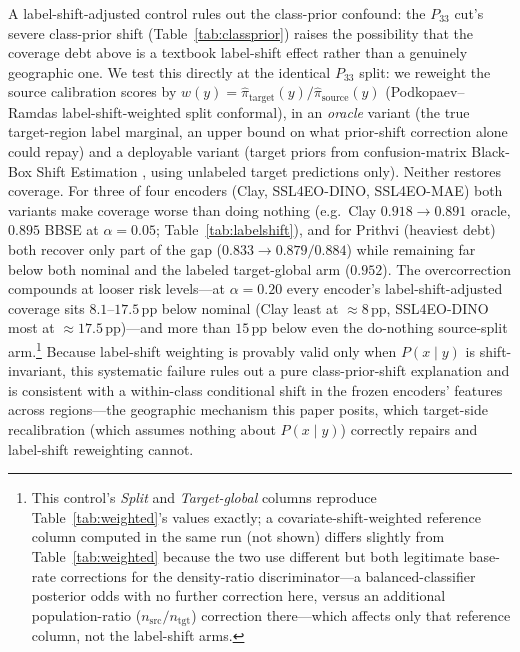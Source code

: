 \documentclass[11pt]{article}
\begin{document}
A label-shift-adjusted control rules out the class-prior confound: the $P_{33}$ cut's
severe class-prior shift (Table~\ref{tab:classprior}) raises the possibility that the
coverage debt above is a textbook label-shift effect \citep{podkopaev2021labelshift} rather than a
genuinely geographic one. We test this directly at the identical $P_{33}$ split: we reweight the
source calibration scores by $w(y)=\hat\pi_{\text{target}}(y)/\hat\pi_{\text{source}}(y)$
(Podkopaev--Ramdas label-shift-weighted split conformal), in an \emph{oracle} variant (the true
target-region label marginal, an upper bound on what prior-shift correction alone could repay) and a
deployable variant (target priors from confusion-matrix Black-Box Shift Estimation
\citep{lipton2018bbse}, using unlabeled target predictions only). Neither restores
coverage. For three of four encoders (Clay, SSL4EO-DINO, SSL4EO-MAE) both variants make coverage
worse than doing nothing (e.g.\ Clay $0.918\to0.891$ oracle, $0.895$ BBSE at $\alpha=0.05$;
Table~\ref{tab:labelshift}), and for Prithvi (heaviest debt) both recover only part of the gap
($0.833\to0.879/0.884$) while remaining far below both nominal and the labeled target-global arm
($0.952$). The overcorrection compounds at looser risk levels---at $\alpha=0.20$ every encoder's
label-shift-adjusted coverage sits $8.1$--$17.5$\,pp below nominal (Clay least at ${\approx}8$\,pp,
SSL4EO-DINO most at ${\approx}17.5$\,pp)---and more than $15$\,pp below even the do-nothing source-split
arm.\footnote{This control's
\emph{Split} and \emph{Target-global} columns reproduce Table~\ref{tab:weighted}'s values exactly; a
covariate-shift-weighted reference column computed in the same run (not shown) differs slightly from
Table~\ref{tab:weighted} because the two use different but both legitimate base-rate corrections for
the density-ratio discriminator---a balanced-classifier posterior odds with no further correction
here, versus an additional population-ratio ($n_{\text{src}}/n_{\text{tgt}}$) correction there---which
affects only that reference column, not the label-shift arms.} Because label-shift weighting is
provably valid only when $P(x\mid y)$ is shift-invariant, this systematic failure rules out a pure
class-prior-shift explanation and is consistent with a within-class conditional shift in the frozen
encoders' features across regions---the geographic mechanism this paper posits, which target-side
recalibration (which assumes nothing about $P(x\mid y)$) correctly repairs and label-shift reweighting
cannot.
\end{document}
